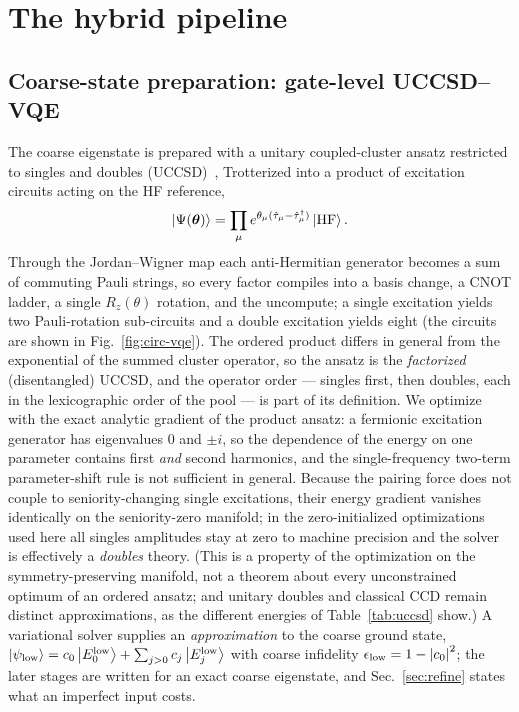 \documentclass[
  aps,            %
  prc,            %
  reprint,        %
  superscriptaddress,
  floatfix,
  nofootinbib
]{revtex4-2}
\begin{document}
\section{The hybrid pipeline}

\subsection{Coarse-state preparation: gate-level UCCSD--VQE}
\label{sec:uccsd}
The coarse eigenstate is prepared with a unitary coupled-cluster ansatz restricted
to singles and doubles (UCCSD)~\cite{LeeUCC2019,Tilly2022}, Trotterized into a
product of excitation circuits acting on the HF reference,
\begin{equation}
  \ket{\Psi(\boldsymbol\theta)}
  =\prod_{\mu} e^{\theta_\mu(\hat\tau_\mu-\hat\tau_\mu^\dagger)}\ket{\rm HF}.
\end{equation}
Through the Jordan--Wigner map each anti-Hermitian generator becomes a sum of
commuting Pauli strings, so every factor compiles into a basis change, a CNOT ladder,
a single $R_z(\theta)$ rotation, and the uncompute; a single excitation yields two
Pauli-rotation sub-circuits and a double excitation yields eight (the circuits are
shown in Fig.~\ref{fig:circ-vqe}).  The ordered product differs in general from
the exponential of the summed cluster operator, so the ansatz is the
\emph{factorized} (disentangled) UCCSD, and the operator order --- singles
first, then doubles, each in the lexicographic order of the pool --- is part
of its definition.  We optimize with the exact analytic gradient of the
product ansatz: a fermionic excitation generator has eigenvalues $0$ and
$\pm i$, so the dependence of the energy on one parameter contains first
\emph{and} second harmonics, and the single-frequency two-term parameter-shift
rule is not sufficient in general.  Because the pairing force does not couple
to seniority-changing single excitations, their energy gradient vanishes
identically on the seniority-zero manifold; in the zero-initialized
optimizations used here all singles amplitudes stay at zero to machine
precision and the solver is effectively a \emph{doubles} theory.  (This is a
property of the optimization on the symmetry-preserving manifold, not a
theorem about every unconstrained optimum of an ordered ansatz; and unitary
doubles and classical CCD remain distinct approximations, as the different
energies of Table~\ref{tab:uccsd} show.)  A variational solver supplies an
\emph{approximation} to the coarse ground state,
$\ket{\psi_{\rm low}}=c_0\ket{E^{\rm low}_0}+\sum_{j>0}c_j\ket{E^{\rm low}_j}$
with coarse infidelity $\epsilon_{\rm low}=1-\abs{c_0}^2$; the later stages
are written for an exact coarse eigenstate, and Sec.~\ref{sec:refine} states
what an imperfect input costs.
\end{document}
